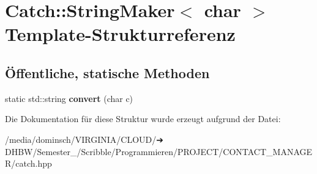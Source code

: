 \hypertarget{structCatch_1_1StringMaker_3_01char_01_4}{}\section{Catch\+:\+:String\+Maker$<$ char $>$ Template-\/\+Strukturreferenz}
\label{structCatch_1_1StringMaker_3_01char_01_4}
\subsection*{Öffentliche, statische Methoden}
\begin{DoxyCompactItemize}
\item 
\mbox{\label{structCatch_1_1StringMaker_3_01char_01_4_a4e3db69a12bb83f3ef89251893e65da5}} 
static std\+::string {\bfseries convert} (char c)
\end{DoxyCompactItemize}


Die Dokumentation für diese Struktur wurde erzeugt aufgrund der Datei\+:\begin{DoxyCompactItemize}
\item 
/media/dominsch/\+V\+I\+R\+G\+I\+N\+I\+A/\+C\+L\+O\+U\+D/➔ D\+H\+B\+W/\+Semester\+\_/\+Scribble/\+Programmieren/\+P\+R\+O\+J\+E\+C\+T/\+C\+O\+N\+T\+A\+C\+T\+\_\+\+M\+A\+N\+A\+G\+E\+R/catch.\+hpp\end{DoxyCompactItemize}
